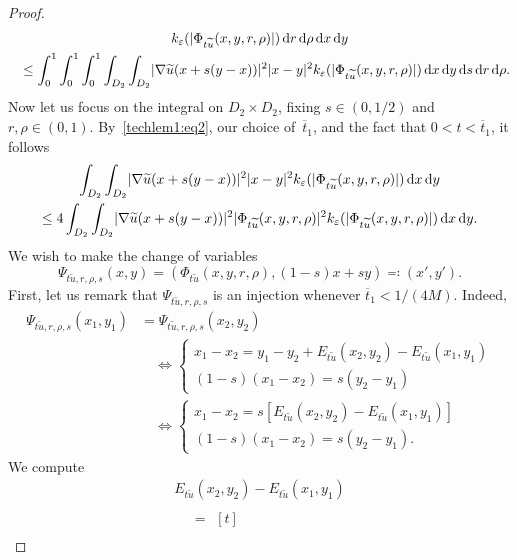 \documentclass[JEP,XML,SOM,Unicode,published]{cedram}
\numberwithin{equation}{section}
\theoremstyle{plain}
\theoremstyle{definition}
\newcommand{\dd}{\mathop{}\mathopen{}\mathrm{d}}
\newcommand{\dx}{\mathop{}\mathopen{}\mathrm{d}x}
\newcommand{\dy}{\mathop{}\mathopen{}\mathrm{d}y}
\newcommand{\dr}{\mathop{}\mathopen{}\mathrm{d}r}
\let\eps\varepsilon
\let\ol\overline
\let\wt\widetilde
\newcommand{\grad}{\nabla}
\DeclarePairedDelimiter{\abs}{\lvert}{\rvert}
\begin{document}
\begin{proof}
\begin{multline}\label{techlem1:eq3}
k_\eps(\abs{\Phi_{t\wt{u}}(x,y,r,\rho)})\dr\dd\rho\dx\dy\\
\quad\leq \int_0^1 \int_0^1\int_0^1 \int_{D_2}\int_{D_2} \abs{\grad\wt{u}(x+s(y-x))}^2 \abs{x-y}^2
k_\eps(\abs{\Phi_{t\wt{u}}(x,y,r,\rho)})\dx\dy\dd s\dr\dd\rho.
\end{multline}
Now let us focus on the integral on $D_2\times D_2$, fixing $s\in(0,1/2)$ and
$r,\rho\in(0,1)$. By~\cref{techlem1:eq2}, our choice of~$\ol{t}_1$, and the fact that
$0<t<\ol{t}_1$, it follows\vspace*{-3pt}
\begin{multline}\label{techlem1:eq4}
\int_{D_2}\int_{D_2} \abs{\grad\wt{u}(x+s(y-x))}^2 \abs{x-y}^2
k_\eps(\abs{\Phi_{t\wt{u}}(x,y,r,\rho)})\dx\dy\\
\leq 4 \int_{D_2}\int_{D_2} \abs{\grad\wt{u}(x+s(y-x))}^2 \abs{\Phi_{t\wt{u}}(x,y,r,\rho)}^2
k_\eps(\abs{\Phi_{t\wt{u}}(x,y,r,\rho)})\dx\dy.
\end{multline}
We wish to make the change of variables\vspace*{-5pt}
\[
\Psi_{t\wt{u},r,\rho,s}(x,y)=(\Phi_{t\wt{u}}(x,y,r,\rho),(1-s)x+sy)\eqqcolon (x',y').
\]
First, let us remark that $\Psi_{t\wt{u},r,\rho,s}$ is an injection whenever
$\ol{t}_1<1/(4M)$. Indeed,\vspace*{-2pt}
\begin{equation}\label{techlem1:eq5}
\begin{aligned}
\Psi_{t\wt{u},r,\rho,s}(x_1,y_1)&=
\Psi_{t\wt{u},r,\rho,s}(x_2,y_2)\\
&\quad\iff
\begin{cases}
x_1-x_2=y_1-y_2+E_{t\wt{u}}(x_2,y_2)-E_{t\wt{u}}(x_1,y_1)\\
(1-s)(x_1-x_2)=s(y_2-y_1)
\end{cases}\\
&\quad\iff
\begin{cases}
x_1-x_2=s\left[E_{t\wt{u}}(x_2,y_2)-E_{t\wt{u}}(x_1,y_1)\right]\\
(1-s)(x_1-x_2)=s(y_2-y_1).
\end{cases}
\end{aligned}
\end{equation}
We compute\vspace*{-5pt}
\begin{multline*}
E_{t\wt{u}}(x_2,y_2)-E_{t\wt{u}}(x_1,y_1)\\
\begin{aligned}
&=
\begin{multlined}[t]

\end{multlined}
\end{aligned}
\end{multline*}
\end{proof}
\end{document}
